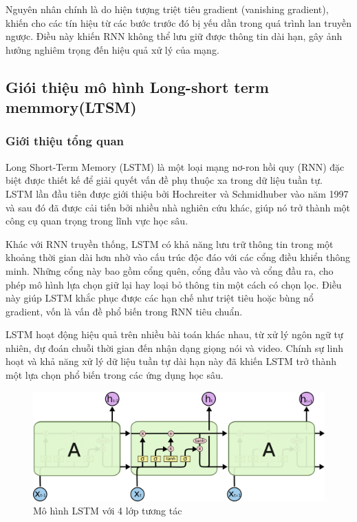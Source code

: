 \indent Nguyên nhân chính là do hiện tượng triệt tiêu gradient (vanishing gradient), khiến cho các tín hiệu từ các bước trước đó bị yếu dần trong quá trình lan truyền ngược. Điều này khiến RNN không thể lưu giữ được thông tin dài hạn, gây ảnh hưởng nghiêm trọng đến hiệu quả xử lý của mạng.


\subsection{Giói thiệu mô hình Long-short term memmory(LTSM)}
\subsubsection{Giới thiệu tổng quan}

\indent Long Short-Term Memory (LSTM) là một loại mạng nơ-ron hồi quy (RNN) đặc biệt được thiết kế để giải quyết vấn đề phụ thuộc xa trong dữ liệu tuần tự. LSTM lần đầu tiên được giới thiệu bởi Hochreiter và Schmidhuber vào năm 1997 và sau đó đã được cải tiến bởi nhiều nhà nghiên cứu khác, giúp nó trở thành một công cụ quan trọng trong lĩnh vực học sâu.

\indent Khác với RNN truyền thống, LSTM có khả năng lưu trữ thông tin trong một khoảng thời gian dài hơn nhờ vào cấu trúc độc đáo với các cổng điều khiển thông minh. Những cổng này bao gồm cổng quên, cổng đầu vào và cổng đầu ra, cho phép mô hình lựa chọn giữ lại hay loại bỏ thông tin một cách có chọn lọc. Điều này giúp LSTM khắc phục được các hạn chế như triệt tiêu hoặc bùng nổ gradient, vốn là vấn đề phổ biến trong RNN tiêu chuẩn.

\indent LSTM hoạt động hiệu quả trên nhiều bài toán khác nhau, từ xử lý ngôn ngữ tự nhiên, dự đoán chuỗi thời gian đến nhận dạng giọng nói và video. Chính sự linh hoạt và khả năng xử lý dữ liệu tuần tự dài hạn này đã khiến LSTM trở thành một lựa chọn phổ biến trong các ứng dụng học sâu.

\begin{figure}[H]
    \centering
    \includegraphics[width=14cm]{Images/Theoretical basis/LSTM.png}
\caption{Mô hình LSTM với 4 lớp tương tác}
\end{figure}
